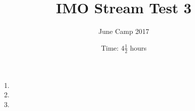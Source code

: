\documentclass{article}
\title{IMO Stream Test 3}
\author{June Camp 2017}
\date{Time: $4\frac{1}{2}$ hours}
\begin{document}
 \maketitle

\begin{enumerate}

\item %
	

\item %
	

\item %
	

\end{enumerate}
\end{document}
